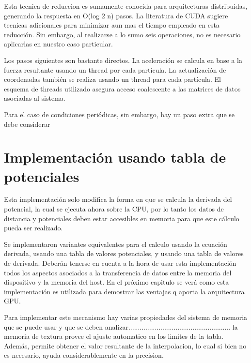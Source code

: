 Esta tecnica de reduccion es sumamente conocida para arquitecturas distribuidas, generando la respuesta en O(log 2 n) pasos. La literatura de CUDA sugiere tecnicas adicionales para minimizar aun mas el tiempo empleado en esta reducción. 
Sin embargo, al realizarse a lo sumo seis operaciones, no es necesario aplicarlas en nuestro caso particular.


Los pasos siguientes son bastante directos. La aceleración se calcula en base a la fuerza resultante usando un thread por cada partícula.
La actualización de coordenadas también se realiza usando un thread para cada partícula. El esquema de threads utilizado asegura acceso coalescente a las matrices de datos asociadas al sistema.

Para el caso de condiciones periódicas, sin embargo, hay un paso extra que se debe considerar


\section{Implementación usando tabla de potenciales}

Esta implementación solo modifica la forma en que se calcula la derivada del potencial, la cual se ejecuta ahora sobre la CPU, por lo tanto los datos de distancia y potenciales deben estar accesibles en memoria para que este cálculo pueda ser realizado.

Se implementaron variantes equivalentes para el calculo usando la ecuación derivada, usando una tabla de valores potenciales, y usando una tabla de valores de derivada.
Deberán tenerse en cuenta a la hora de usar esta implementación todos los aspectos asociados a la transferencia de datos entre la memoria del dispositivo y la memoria del host. En el próximo capitulo se verá como esta implementación es utilizada para demostrar las ventajas q aporta la arquitectura GPU.


Para implementar este mecanismo hay varias propiedades del sistema de memoria que se puede usar y que se deben analizar......................................................
la memoria de textura provee el ajuste automatico en los limites de la tabla. Además, permite obtener el valor resultante de la interpolacion, lo cual si bien no es necesario, ayuda considerablemente en la precision.



